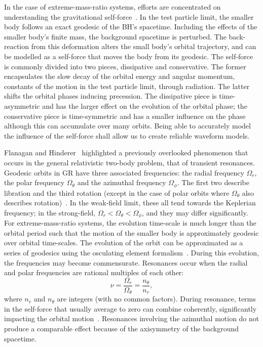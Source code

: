 \documentclass[aps,prd,amsfonts,amssymb,amsmath,nofootinbib,showpacs,superscriptaddress,twocolumn]{revtex4}
\begin{document}
In the case of extreme-mass-ratio systems, efforts are concentrated on understanding the gravitational self-force~\cite{Barack2009,Poisson2004}. In the test particle limit, the smaller body follows an exact geodesic of the BH's spacetime. Including the effects of the smaller body's finite mass, the background spacetime is perturbed. The back-reaction from this deformation alters the small body's orbital trajectory, and can be modelled as a self-force that moves the body from its geodesic. The self-force is commonly divided into two pieces, dissipative and conservative. The former encapsulates the slow decay of the orbital energy and angular momentum, constants of the motion in the test particle limit, through radiation. The latter shifts the orbital phases inducing precession. The dissipative piece is time-asymmetric and has the larger effect on the evolution of the orbital phase; the conservative piece is time-symmetric and has a smaller influence on the phase although this can accumulate over many orbits. Being able to accurately model the influence of the self-force shall allow us to create reliable waveform models.

Flanagan and Hinderer~\cite{Flanagan2012} highlighted a previously overlooked phenomenon that occurs in the general relativistic two-body problem, that of transient resonances. Geodesic orbits in GR have three associated frequencies: the radial frequency $\Omega_r$, the polar frequency $\Omega_\theta$ and the azimuthal frequency $\Omega_\phi$. The first two describe libration and the third rotation (except in the case of polar orbits where $\Omega_\theta$ also describes rotation)~\cite{Goldstein2002}. %
In the weak-field limit, these all tend towards the Keplerian frequency; in the strong-field, $\Omega_r < \Omega_\theta < \Omega_\phi$, and they may differ significantly. For extreme-mass-ratio systems, the evolution time-scale is much longer than the orbital period such that the motion of the smaller body is approximately geodesic over orbital time-scales. The evolution of the orbit can be approximated as a series of geodesics using the osculating element formalism~\cite{Pound2008,Gair2011a}. During this evolution, the frequencies may become commensurate. Resonances occur when the radial and polar frequencies are rational multiples of each other:
\begin{equation}
\nu = \frac{\Omega_r}{\Omega_\theta} = \frac{n_\theta}{n_r},
\end{equation}
where $n_r$ and $n_\theta$ are integers (with no common factors). During resonance, terms in the self-force that usually average to zero can combine coherently, significantly impacting the orbital motion~\cite{Flanagan2012a}. Resonances involving the azimuthal motion do not produce a comparable effect because of the axisymmetry of the background spacetime.
\end{document}
